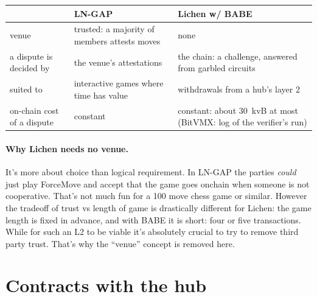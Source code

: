\documentclass[11pt]{article}
\begin{document}
\begin{center}
\small
\begin{tabularx}{\linewidth}{p{24mm}LL}
\toprule
& LN-GAP &  Lichen w/ BABE  \\
\midrule
venue & trusted: a majority of members attests moves & none \\
a dispute is decided by & the venue's attestations  & the chain: a challenge, answered from garbled circuits \\
suited to & interactive games where time has value  & withdrawals from a hub's layer 2 \\
on-chain cost of a dispute & constant & constant: about 30~kvB at most (BitVMX: log of the verifier's run) \\
\bottomrule
\end{tabularx}
\end{center}

\paragraph{Why Lichen needs no venue.}  It's more about choice than logical requirement. In LN-GAP the parties \emph{could} just play ForceMove and accept that the game goes onchain when someone is not cooperative. That's not much fun for a 100 move chess game or similar. However the tradeoff of trust vs length of game is drastically different for Lichen: the game length is fixed in advance, and with BABE it is short: four or five transactions. While for such an L2 to be viable it's absolutely crucial to try to remove third party trust. That's why the ``venue'' concept is removed here.

\section{Contracts with the hub}
\label{sec:terms}
\end{document}
